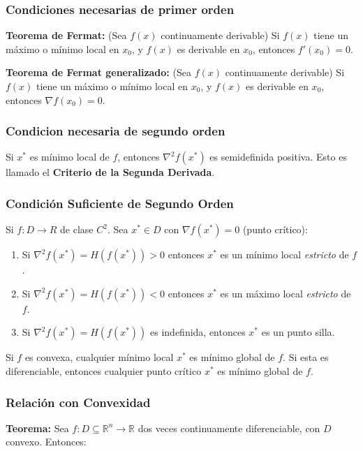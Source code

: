 \documentclass{article}
\begin{document}
\subsubsection{Condiciones necesarias de primer orden}

\textbf{Teorema de Fermat:} (Sea $f(x)$ continuamente derivable) Si $f(x)$ tiene un máximo o mínimo local en $x_0$, y $f(x)$ es derivable en $x_0$, entonces $f'(x_0) = 0$.

\textbf{Teorema de Fermat generalizado:} (Sea $f(x)$ continuamente derivable) Si $f(x)$ tiene un máximo o mínimo local en $x_0$, y $f(x)$ es derivable en $x_0$, entonces $\nabla f(x_0) = 0$.

\subsubsection{Condicion necesaria de segundo orden}

Si $x^*$ es mínimo local de $f$, entonces $\nabla^2f(x^*)$ es semidefinida positiva. Esto es llamado el \textbf{Criterio de la Segunda Derivada}.

\subsubsection{Condición Suficiente de Segundo Orden}

Si $f:D\to R$ de clase $C^2$. Sea $x^* \in D$ con $\nabla f(x^*)=0$ (punto crítico):

\begin{enumerate}
    \item Si $\nabla^2f(x^*)=H(f(x^*)) > 0$ entonces $x^*$ es un mínimo local \textit{estricto} de $f$.
    \item Si $\nabla^2f(x^*)=H(f(x^*)) < 0$ entonces $x^*$ es un máximo local \textit{estricto} de $f$.
    \item Si $\nabla^2f(x^*)=H(f(x^*))$ es indefinida, entonces $x^*$ es un punto silla.
\end{enumerate}

Si $f$ es convexa, cualquier mínimo local $x^*$ es mínimo global de $f$. Si esta es diferenciable, entonces cualquier punto crítico $x^*$ es mínimo global de $f$.

\subsubsection{Relación con Convexidad}

\textbf{Teorema:} Sea $f:D \subseteq \mathbb{R}^n \to \mathbb{R}$ dos veces continuamente diferenciable, con $D$ convexo. Entonces:
\end{document}
